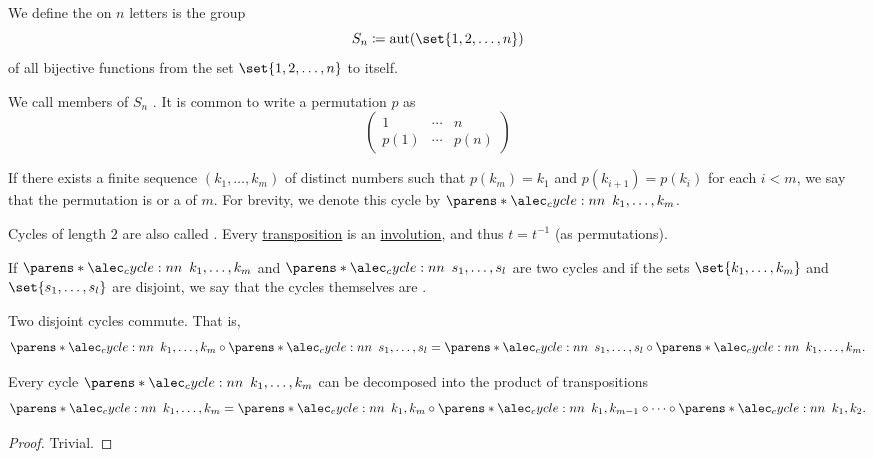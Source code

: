 \begin{definition}\label{def:symmetric_group}
  We define the  on \( n \) letters is the group
  \begin{equation*}
    S_n \coloneqq \aut(\set{ 1, 2, \ldots, n })
  \end{equation*}
  of all bijective functions from the set \( \set{ 1, 2, \ldots, n } \) to itself.

  \begin{thmenum}
     We call members of \( S_n \) . It is common to write a permutation \( p \) as
    \begin{equation*}
      \begin{pmatrix}
        1    & \cdots & n \\
        p(1) & \cdots & p(n)
      \end{pmatrix}
    \end{equation*}

     If there exists a finite sequence \( (k_1, \ldots, k_m) \) of distinct numbers such that \( p(k_m) = k_1 \) and \( p(k_{i+1}) = p(k_i) \) for each \( i < m \), we say that the permutation is  or a  of  \( m \). For brevity, we denote this cycle by \( \cycle{k_1, \ldots, k_m} \).

    Cycles of length \( 2 \) are also called . Every \hyperref[def:symmetric_group/cycle]{transposition} is an \hyperref[def:set_with_involution]{involution}, and thus \( t = t^{-1} \) (as permutations).

     If \( \cycle{k_1, \ldots, k_m} \) and \( \cycle{s_1, \ldots, s_l} \) are two cycles and if the sets \( \set{ k_1, \ldots, k_m } \) and \( \set{ s_1, \ldots, s_l } \) are disjoint, we say that the cycles themselves are .

    Two disjoint cycles commute. That is,
    \begin{equation*}
      \cycle{k_1, \ldots, k_m} \bincirc \cycle{s_1, \ldots, s_l} = \cycle{s_1, \ldots, s_l} \bincirc \cycle{k_1, \ldots, k_m}.
    \end{equation*}
  \end{thmenum}
\end{definition}

\begin{proposition}\label{thm:cycle_transposition_decomposition}
  Every cycle \( \cycle{ k_1, \ldots, k_m } \) can be decomposed into the product of transpositions
  \begin{equation*}
    \cycle{ k_1, \ldots, k_m } = \cycle{ k_1, k_m } \bincirc \cycle{ k_1, k_{m-1} } \bincirc \cdots \bincirc \cycle{ k_1, k_2 }.
  \end{equation*}
\end{proposition}
\begin{proof}
  Trivial.
\end{proof}

